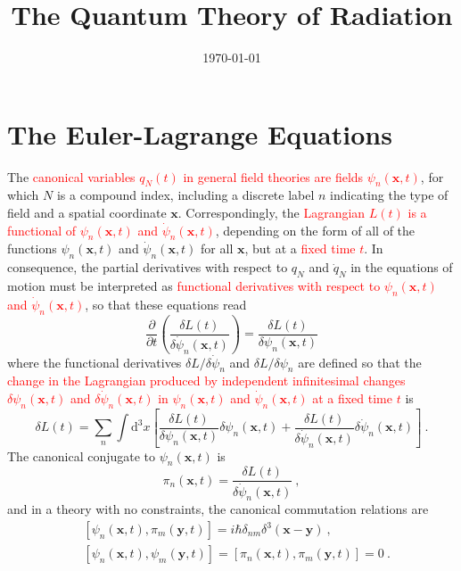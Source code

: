 \documentclass[11pt,a4paper]{article}
\title{The Quantum Theory of Radiation}
\author{}
\date{\today}
\renewcommand{\vec}[1]{\boldsymbol{#1}}
\newcommand{\dif}{\mathrm{d}}
\newcounter{theo}[section]\setcounter{theo}{0}
\begin{document}
\maketitle

\section{The Euler-Lagrange Equations}
\cite{2015lqm..book.....W} The \textcolor{red}{canonical variables $q_N(t)$ in general field theories are fields $\psi_n(\vec{x}, t)$}, for which $N$ is a compound index, including a discrete label $n$ indicating the type of field and a spatial coordinate $\vec{x}$. Correspondingly, the \textcolor{red}{Lagrangian $L(t)$ is a functional of $\psi_n(\vec{x},t)$ and $\dot{\psi}_n(\vec{x},t)$}, depending on the form of all of the functions $\psi_n(\vec{x},t)$ and $\dot{\psi}_n(\vec{x},t)$ for all $\vec{x}$, but at a \textcolor{red}{fixed time $t$}. In consequence, the partial derivatives with respect to $q_N$ and $\dot{q}_N$ in the equations of motion must be interpreted as \textcolor{red}{functional derivatives with respect to $\psi_n(\vec{x},t)$ and $\dot{\psi}_n(\vec{x},t)$}, so that these equations read
\begin{equation}
\dfrac{\partial}{\partial t} \left(\dfrac{\delta L(t)}{\delta \dot{\psi}_n(\vec{x},t)} \right) = \dfrac{\delta L(t)}{\delta \psi_n(\vec{x},t)}
\end{equation}
where the functional derivatives $\delta L /\delta \dot{\psi}_n$ and $\delta L /\delta \psi_n$ are defined so that the \textcolor{red}{change in the Lagrangian produced by independent infinitesimal changes $\delta \psi_n(\vec{x},t)$ and $\delta \dot{\psi}_n(\vec{x},t)$ in $\psi_n(\vec{x},t)$ and $\dot{\psi}_n(\vec{x},t)$ at a fixed time $t$} is
\begin{equation}
\delta L(t) = \sum_n \int \dif^3 x \left[\dfrac{\delta L(t)}{\delta \psi_n(\vec{x},t)} \delta \psi_n(\vec{x},t) +\dfrac{\delta L(t)}{\delta \dot{\psi}_n(\vec{x},t)} \delta \dot{\psi}_n(\vec{x},t) \right] ~.
\end{equation}
The canonical conjugate to $\psi_n(\vec{x},t)$ is
\begin{equation}
\pi_n(\vec{x},t) = \dfrac{\delta L(t)}{\delta \dot{\psi}_n(\vec{x},t)}  ~,
\end{equation}
and in a theory with no constraints, the canonical commutation relations are
\begin{align}
& [\psi_n(\vec{x},t), \pi_m(\vec{y},t)] = i\hbar \delta_{nm} \delta^3(\vec{x} -\vec{y}) ~, \\
& [\psi_n(\vec{x},t), \psi_m(\vec{y},t)] = [\pi_n(\vec{x},t), \pi_m(\vec{y},t)] = 0 ~. 
\end{align}
\end{document}
